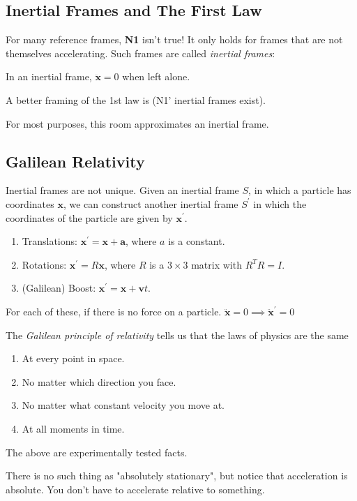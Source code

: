 \subsection{Inertial Frames and The First Law}
For many reference frames, \textbf{N1} isn't true! It only holds for frames that are not themselves accelerating. Such frames are called \textit{inertial frames}:
\begin{definition}
    In an inertial frame, $\ddot{\mathbf{x} }=0$ when left alone.
\end{definition}

A better framing of the 1st law is (N1' inertial frames exist).

For most purposes, this room approximates an inertial frame.

\subsection{Galilean Relativity}
Inertial frames are not unique. Given an inertial frame $S$, in which a particle has coordinates $\mathbf{x} $, we can construct another inertial frame $S^\prime $ in which the coordinates of the particle are given by $\mathbf{x} ^\prime $.
\begin{enumerate}
    \item Translations: $\mathbf{x} ^\prime =\mathbf{x}  + \mathbf{a} $, where $a$ is a constant.
    \item Rotations: $\mathbf{x} ^\prime = R\mathbf{x} $, where $R$ is a $3\times 3$ matrix with $R^{T}R=I$.
    \item (Galilean) Boost: $\mathbf{x}^\prime =\mathbf{x}  + \mathbf{v} t$.
\end{enumerate}

For each of these, if there is no force on a particle.
\(\ddot{\mathbf{x}} = 0 \implies \ddot{\textbf{x}}^\prime =0 \) 

The \textit{Galilean principle of relativity} tells us that the laws of physics are the same
\begin{enumerate}
    \item At every point in space.
    \item No matter which direction you face.
    \item No matter what constant velocity you move at.
    \item At all moments in time.
\end{enumerate}
The above are experimentally tested facts.

There is no such thing as "absolutely stationary", but notice that acceleration is absolute. You don't have to accelerate relative to something.
